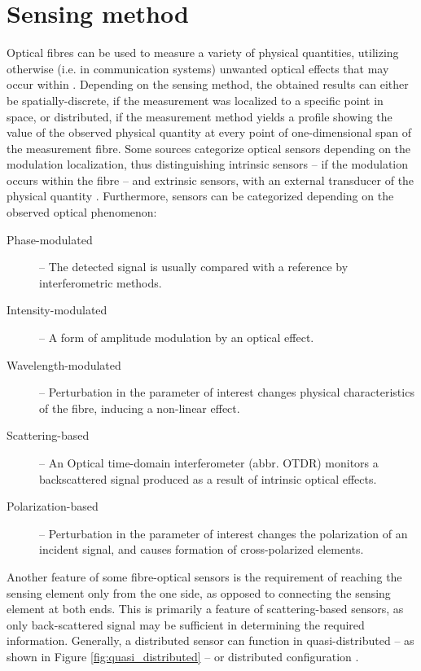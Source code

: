 \documentclass{standalone}
\begin{document}
\chapter{Sensing method}
\setcounter{page}\thestranica


Optical fibres can be used to measure a variety of physical quantities, utilizing otherwise (i.e. in communication systems) unwanted optical effects that may occur within \cite{krohnFundamentals}. Depending on the sensing method, the obtained results can either be spatially-discrete, if the measurement was localized to a specific point in space, or distributed, if the measurement method yields a profile showing the value of the observed physical quantity at every point of one-dimensional span of the measurement fibre. Some sources categorize optical sensors depending on the modulation localization, thus distinguishing intrinsic sensors -- if the modulation occurs within the fibre -- and extrinsic sensors, with an external transducer of the physical quantity \cite{mitschke2010fiber}. Furthermore, sensors can be categorized depending on the observed optical phenomenon:
\begin{description}
	\item[Phase-modulated] -- The detected signal is usually compared with a reference by interferometric methods.
	\item[Intensity-modulated] -- A form of amplitude modulation by an optical effect.
	\item[Wavelength-modulated] -- Perturbation in the parameter of interest changes physical characteristics of the fibre, inducing a non-linear effect.
	\item[Scattering-based] -- An Optical time-domain interferometer (abbr. OTDR) monitors a backscattered signal produced as a result of intrinsic optical effects.
	\item[Polarization-based] -- Perturbation in the parameter of interest changes the polarization of an incident signal, and causes formation of cross-polarized elements.
\end{description}
Another feature of some fibre-optical sensors is the requirement of reaching the sensing element only from the one side, as opposed to connecting the sensing element at both ends. This is primarily a feature of scattering-based sensors, as only back-scattered signal may be sufficient in determining the required information. Generally, a distributed sensor can function in quasi-distributed -- as shown in Figure \ref{fig:quasi_distributed} -- or distributed configuration \cite{Rogers1999}.
\end{document}

